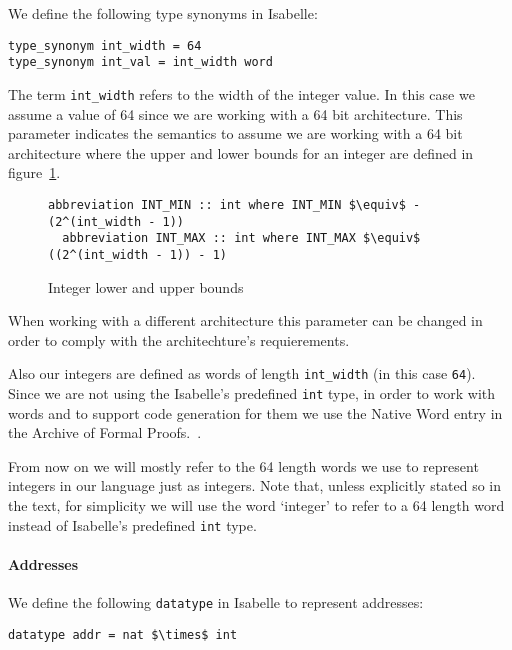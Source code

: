 We define the following type synonyms in Isabelle:

\begin{lstlisting}[frame=single]
type_synonym int_width = 64
type_synonym int_val = int_width word
\end{lstlisting}


The term \verb|int_width| refers to the width of the integer value.
In this case we assume a value of 64 since we are working with a 64 bit architecture.
This parameter indicates the semantics to assume we are working with a 64 bit architecture where the upper and lower bounds for an integer are defined in figure~\ref{fig:int_bounds}.

\begin{figure}
  \caption{Integer lower and upper bounds}
  \label{fig:int_bounds}

  \begin{lstlisting}[frame=single, mathescape=true]
  abbreviation INT_MIN :: int where INT_MIN $\equiv$ - (2^(int_width - 1))
  abbreviation INT_MAX :: int where INT_MAX $\equiv$  ((2^(int_width - 1)) - 1)
  \end{lstlisting}
\end{figure}

When working with a different architecture this parameter can be changed in order to comply with the architechture's requierements.

Also our integers are defined as words of length \verb|int_width| (in this case \verb|64|).
Since we are not using the Isabelle's predefined \verb|int| type, in order to work with words and to support code generation for them we use the Native Word entry in the Archive of Formal Proofs.~\parencite{Native_Word-AFP}.

From now on we will mostly refer to the 64 length words we use to represent integers in our language just as integers.
Note that, unless explicitly stated so in the text, for simplicity we will use the word `integer' to refer to a 64 length word instead of Isabelle's predefined \verb|int| type.

\paragraph{Addresses}

We define the following \verb|datatype| in Isabelle to represent addresses:

\begin{lstlisting}[frame=single, mathescape=true]
datatype addr = nat $\times$ int
\end{lstlisting}

